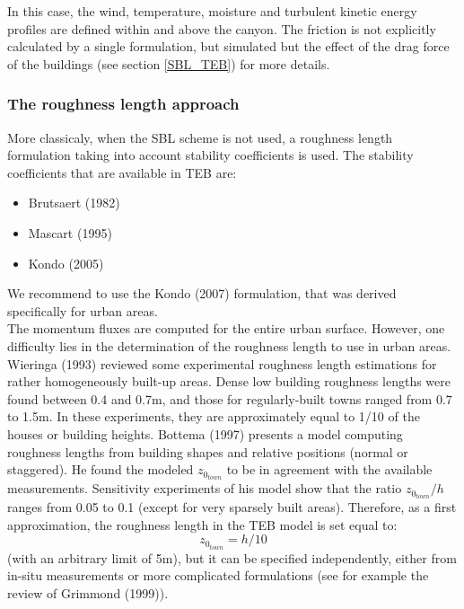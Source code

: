 In this case, the wind, temperature, moisture and turbulent kinetic energy profiles are defined within and above the canyon. The friction is not explicitly calculated by a single formulation, but simulated but the effect of the drag force of the buildings (see section \ref{SBL_TEB}) for more details.

\subsubsection{The roughness length approach}

More classicaly, when the SBL scheme is not used, a roughness length formulation taking into account stability coefficients is used.
The stability coefficients that are available in TEB are:
 \begin{itemize}
\item Brutsaert (1982) \nocite{Brutsaert1982}
\item Mascart \etal (1995)\nocite{Mascart1995}
\item Kondo \etal  (2005)\nocite{Kondo2005}
 \end{itemize}
 We recommend to use the Kondo \etal (2007) formulation, that was derived specifically for urban areas. \\

The momentum fluxes are computed for the entire urban surface.
However, one difficulty lies in the determination of the roughness length
to use in urban areas. Wieringa (1993) reviewed
some experimental roughness length estimations for rather
homogeneously built-up areas. Dense low building roughness lengths
were found between 0.4 and 0.7m, and those for 
regularly-built towns ranged from
0.7 to 1.5m. In these experiments, they are approximately equal to 1/10
of the houses or building heights. Bottema (1997)\nocite{Bottema1997} 
presents a model computing roughness lengths from building shapes and
relative positions (normal or staggered). He found the modeled
$z_{0_{town}}$ to be in agreement with the available measurements. Sensitivity
experiments of his model show that the ratio $z_{0_{town}}/h$ ranges from
0.05 to 0.1 (except for very sparsely built areas). Therefore, as a first
approximation, the roughness length in the TEB model is set equal to:
\begin{displaymath}
z_{0_{town}} = h/10
\end{displaymath}
(with an arbitrary limit of 5m), but it can be
specified independently, either from in-situ measurements
or more complicated formulations (see for example the review
of Grimmond (1999)\nocite{Grimmond1999}).

